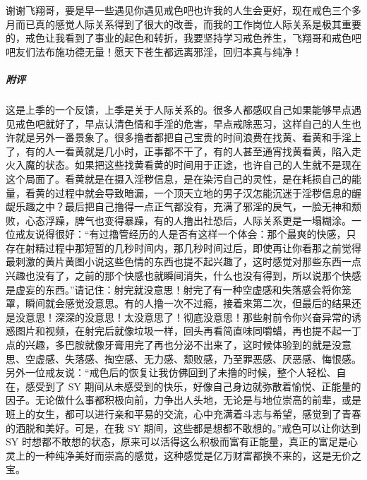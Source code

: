 \begin{case}
    谢谢飞翔哥，要是早一些遇见你遇见戒色吧也许我的人生会更好，现在戒色三个多月而已真的感觉人际关系得到了很大的改善，而我的工作岗位人际关系是极其重要的，戒色让我看到了事业的起色和转折，我要坚持学习戒色养生，飞翔哥和戒色吧吧友们法布施功德无量！愿天下苍生都远离邪淫，回归本真与纯净！
    \subparagraph{附评} 这是上季的一个反馈，上季是关于人际关系的。很多人都感叹自己如果能够早点遇见戒色吧就好了，早点认清色情和手淫的危害，早点戒除恶习，这样自己的人生也许就是另外一番景象了。很多撸者都把自己宝贵的时间浪费在找黄、看黄和手淫上了，有的人一看黄就是几小时，正事都不干了，有的人甚至通宵找黄看黄，陷入走火入魔的状态。如果把这些找黄看黄的时间用于正途，也许自己的人生就不是现在这个局面了。看黄就是在摄入淫秽信息，是在染污自己的灵性，是在耗损自己的能量，看黄的过程中就会导致暗漏，一个顶天立地的男子汉怎能沉迷于淫秽信息的龌龊乐趣之中？最后把自己撸得一点正气都没有，充满了邪淫的戾气，一脸无神和颓败，心态浮躁，脾气也变得暴躁，有的人撸出社恐后，人际关系更是一塌糊涂。一位戒友说得很好：“有过撸管经历的人是否有这样一个体会：那个最爽的快感，只存在射精过程中那短暂的几秒时间内，那几秒时间过后，即使再让你看那之前觉得最刺激的黄片黄图小说这些色情的东西也提不起兴趣了，这时感觉对那些东西一点兴趣也没有了，之前的那个快感也就瞬间消失，什么也没有得到，所以说那个快感是虚妄的东西。”请记住：射完就没意思！射完了有一种空虚感和失落感会将你笼罩，瞬间就会感觉没意思。有的人撸一次不过瘾，接着来第二次，但最后的结果还是没意思！深深的没意思！太没意思了！彻底没意思！那些射前令你兴奋异常的诱惑图片和视频，在射完后就像垃圾一样，回头再看简直味同嚼蜡，再也提不起一丁点的兴趣，多巴胺就像牙膏用完了再也分泌不出来了，这时候体验到的就是没意思、空虚感、失落感、掏空感、无力感、颓败感，乃至罪恶感、厌恶感、悔恨感。另外一位戒友说：“戒色后的恢复让我仿佛回到了未撸的时候，整个人轻松、自在，感受到了 SY 期间从未感受到的快乐，好像自己身边就弥散着愉悦、正能量的因子。无论做什么事都积极向前，力争出人头地，无论是与地位崇高的前辈，或是班上的女生，都可以进行亲和平易的交流，心中充满着斗志与希望，感觉到了青春的洒脱和美好。可是，在我 SY 期间，这些都是想都不敢想的。”戒色可以让你达到 SY 时想都不敢想的状态，原来可以活得这么积极而富有正能量，真正的富足是心灵上的一种纯净美好而崇高的感觉，这种感觉是亿万财富都换不来的，这是无价之宝。
\end{case}

